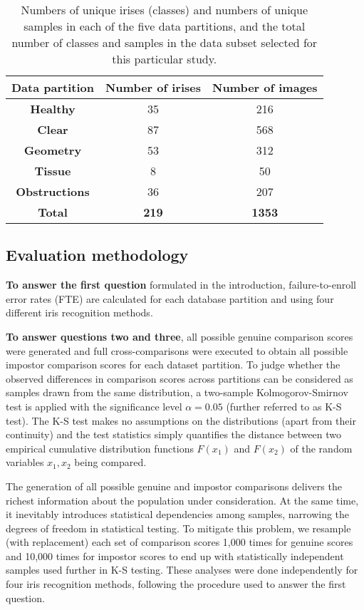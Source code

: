 \documentclass[article,12pt]{elsarticle}
\begin{document}
\begin{table*}[!ht]
\renewcommand{\arraystretch}{1.1}
\caption{Numbers of unique irises (classes) and numbers of unique samples in each of the five data partitions, and the total number of classes and samples in the data subset selected for this particular study.}
\label{table:subsets}
\centering\footnotesize
\begin{tabular}[t]{|c|c|c|}
\hline
\textbf{Data partition} & \textbf{Number of irises} & \textbf{Number of images} \\
\hline
\hline
\textbf{Healthy} & 35 & 216 \\
\hline
\textbf{Clear} & 87 & 568 \\
\hline
\textbf{Geometry} & 53 & 312 \\
\hline
\textbf{Tissue} & 8 & 50 \\
\hline
\textbf{Obstructions} & 36 & 207 \\
\hline\hline
\textbf{Total} & \textbf{219} & \textbf{1353} \\
\hline
\end{tabular}
\end{table*}


\subsection{Evaluation methodology} 
\label{sec:methodology}

\textbf{To answer the first question} formulated in the introduction, failure-to-enroll error rates (FTE) are calculated for each database partition and using four different iris recognition methods.

\textbf{To answer questions two and three}, all possible genuine comparison scores were generated and full cross-comparisons were executed to obtain all possible impostor comparison scores for each dataset partition. To judge whether the observed differences in comparison scores across partitions can be considered as samples drawn from the same distribution, a two-sample Kolmogorov-Smirnov test is applied with the significance level $\alpha=0.05$ (further referred to as K-S test). The K-S test makes no assumptions on the distributions (apart from their continuity) and the test statistics simply quantifies the distance between two empirical cumulative distribution functions $F(x_1)$ and $F(x_2)$ of the random variables $x_1, x_2$ being compared.

The generation of all possible genuine and impostor comparisons delivers the richest information about the population under consideration. At the same time, it inevitably introduces statistical dependencies among samples, narrowing the degrees of freedom in statistical testing. To mitigate this problem, we resample (with replacement) each set of comparison scores 1,000 times for genuine scores and 10,000 times for impostor scores to end up with statistically independent samples used further in K-S testing. These analyses were done independently for four iris recognition methods, following the procedure used to answer the first question.
\end{document}
